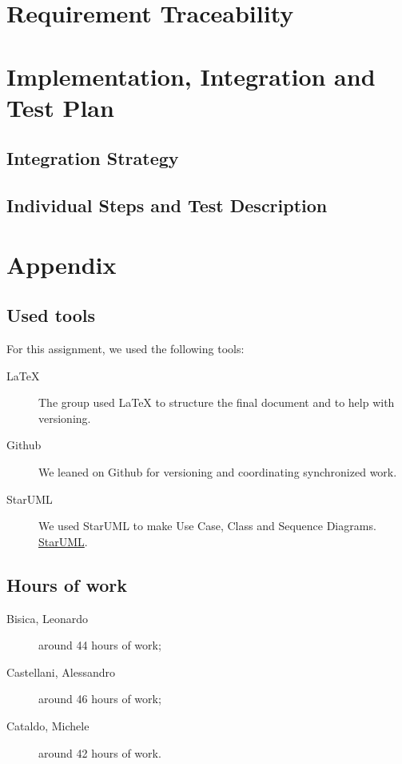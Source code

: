 \documentclass[12pt, a4paper]{article}
\begin{document}
		
	\section{Requirement Traceability}
		

	\newpage
	\section{Implementation, Integration and Test Plan}
		
		\subsection{Integration Strategy}
			
			
		\subsection{Individual Steps and Test Description}
			

	\newpage	
	\section{Appendix}
		\listoffigures
		\listofalgorithms
		
		\subsection{Used tools}
		For this assignment, we used the following tools:
		
		\begin{description}
			\item [LaTeX] The group used LaTeX to structure the final document and to help with versioning.
			\item [Github] We leaned on Github for versioning and coordinating synchronized work.
			\item[StarUML] We used StarUML  to make Use Case, Class and Sequence Diagrams. \href{http://staruml.io/}{StarUML}.
			
		\end{description}
		
		\subsection{Hours of work}
			\begin{description}
				\item[Bisica, Leonardo] around 44 hours of work;
				\item[Castellani, Alessandro] around 46 hours of work;
				\item[Cataldo, Michele] around 42 hours of work.
			\end{description}
			
\end{document}

